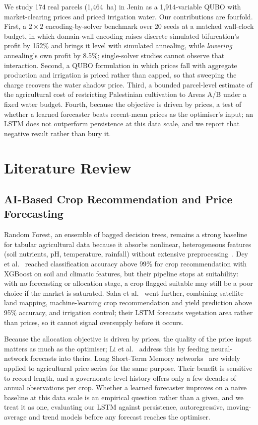 \documentclass[conference,a4paper]{IEEEtran}
\begin{document}
We study 174 real parcels (1{,}464~ha) in Jenin as a 1{,}914-variable QUBO
with market-clearing prices and priced irrigation water. Our contributions
are fourfold. First, a $2\times2$ encoding-by-solver benchmark over 20 seeds
at a matched wall-clock budget, in which domain-wall encoding raises
discrete simulated bifurcation's profit by 152\% and brings it level with
simulated annealing, while \emph{lowering} annealing's own profit by 8.5\%;
single-solver studies cannot observe that interaction. Second, a QUBO
formulation in which prices fall with aggregate production and irrigation is
priced rather than capped, so that sweeping the charge recovers the water
shadow price. Third, a bounded parcel-level estimate of the agricultural
cost of restricting Palestinian cultivation to Areas A/B under a fixed water
budget. Fourth, because the objective is driven by prices, a test of whether
a learned forecaster beats recent-mean prices as the optimiser's input; an
LSTM does not outperform persistence at this data scale, and we report that
negative result rather than bury it.

\section{Literature Review}
\label{sec:lit}

\subsection{AI-Based Crop Recommendation and Price Forecasting}

Random Forest, an ensemble of bagged decision trees, remains a strong
baseline for tabular agricultural data because it absorbs nonlinear,
heterogeneous features (soil nutrients, pH, temperature, rainfall) without
extensive preprocessing~\cite{breiman2001}. Dey et al.~\cite{dey2024}
reached classification accuracy above 99\% for crop recommendation with
XGBoost on soil and climatic features, but their pipeline stops at
suitability: with no forecasting or allocation stage, a crop flagged
suitable may still be a poor choice if the market is saturated. Saha et al.~\cite{saha2025} went further, combining satellite land mapping,
machine-learning crop recommendation and yield prediction above 95\%
accuracy, and irrigation control; their LSTM forecasts vegetation area
rather than prices, so it cannot signal oversupply before it occurs.

Because the allocation objective is driven by prices, the quality of the price
input matters as much as the optimiser; Li et al.~\cite{li2025} address this by
feeding neural-network forecasts into theirs. Long Short-Term Memory
networks~\cite{hochreiter1997} are widely applied to agricultural price series
for the same purpose. Their benefit is sensitive to record length, and a
governorate-level history offers only a few decades of annual observations per
crop. Whether a learned forecaster improves on a naive baseline at this data
scale is an empirical question rather than a given, and we treat it as one,
evaluating our LSTM against persistence, autoregressive, moving-average and
trend models before any forecast reaches the optimiser.
\end{document}
